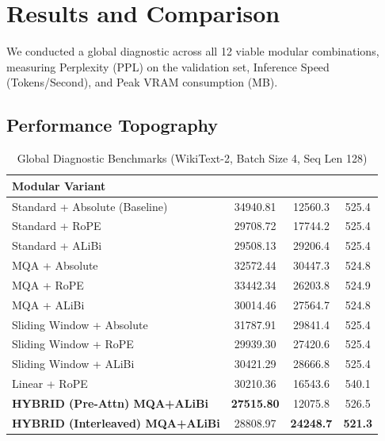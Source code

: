 \documentclass[11pt,a4paper]{article}
\begin{document}
\section{Results and Comparison}

We conducted a global diagnostic across all 12 viable modular combinations, measuring Perplexity (PPL) on the validation set, Inference Speed (Tokens/Second), and Peak VRAM consumption (MB).

\subsection{Performance Topography}

\begin{table}[h]
    \centering
    \caption{Global Diagnostic Benchmarks (WikiText-2, Batch Size 4, Seq Len 128)}
    \begin{tabular*}{\textwidth}{@{\extracolsep{\fill}}l S[table-format=5.2] S[table-format=5.1] S[table-format=3.1] @{}}
        \toprule
        \textbf{Modular Variant} & {} & {} & {} \\
        \midrule
        Standard + Absolute (Baseline) & 34940.81 & 12560.3 & 525.4 \\
        Standard + RoPE               & 29708.72 & 17744.2 & 525.4 \\
        Standard + ALiBi              & 29508.13 & 29206.4 & 525.4 \\
        \midrule
        MQA + Absolute                & 32572.44 & 30447.3 & 524.8 \\
        MQA + RoPE                    & 33442.34 & 26203.8 & 524.9 \\
        MQA + ALiBi                   & 30014.46 & 27564.7 & 524.8 \\
        \midrule
        Sliding Window + Absolute     & 31787.91 & 29841.4 & 525.4 \\
        Sliding Window + RoPE         & 29939.30 & 27420.6 & 525.4 \\
        Sliding Window + ALiBi        & 30421.29 & 28666.8 & 525.4 \\
        \midrule
        Linear + RoPE                 & 30210.36 & 16543.6 & 540.1 \\
        \midrule
        \textbf{HYBRID (Pre-Attn) MQA+ALiBi} & \textbf{27515.80} & 12075.8 & 526.5 \\
        \textbf{HYBRID (Interleaved) MQA+ALiBi} & 28808.97 & \textbf{24248.7} & \textbf{521.3} \\
        \bottomrule
    \end{tabular*}
    \label{tab:global_diagnostics}
\end{table}
\end{document}
